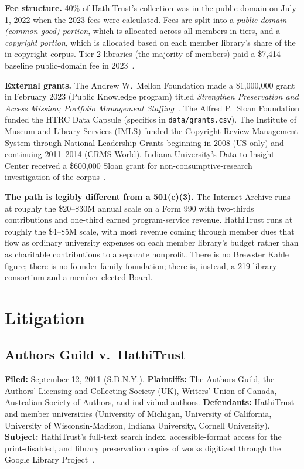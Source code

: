 \documentclass[10pt,letterpaper,twocolumn]{article}
\begin{document}
\textbf{Fee structure.} 40\% of HathiTrust's collection was in the public domain on July 1, 2022 when the 2023 fees were calculated. Fees are split into a \emph{public-domain (common-good) portion}, which is allocated across all members in tiers, and a \emph{copyright portion}, which is allocated based on each member library's share of the in-copyright corpus. Tier 2 libraries (the majority of members) paid a \$7{,}414 baseline public-domain fee in 2023~\citep{hathicost}.

\textbf{External grants.} The Andrew W.~Mellon Foundation made a \$1{,}000{,}000 grant in February 2023 (Public Knowledge program) titled \emph{Strengthen Preservation and Access Mission; Portfolio Management Staffing}~\citep{hathimellon2023}. The Alfred P.~Sloan Foundation funded the HTRC Data Capsule (specifics in \texttt{data/grants.csv}). The Institute of Museum and Library Services (IMLS) funded the Copyright Review Management System through National Leadership Grants beginning in 2008 (US-only) and continuing 2011--2014 (CRMS-World). Indiana University's Data to Insight Center received a \$600{,}000 Sloan grant for non-consumptive-research investigation of the corpus~\citep{iudata2011}.

\textbf{The path is legibly different from a 501(c)(3).} The Internet Archive runs at roughly the \$20--\$30M annual scale on a Form 990 with two-thirds contributions and one-third earned program-service revenue. HathiTrust runs at roughly the \$4--\$5M scale, with most revenue coming through member dues that flow as ordinary university expenses on each member library's budget rather than as charitable contributions to a separate nonprofit. There is no Brewster Kahle figure; there is no founder family foundation; there is, instead, a 219-library consortium and a member-elected Board.

\section{Litigation}\label{sec:litigation}

\subsection{Authors Guild v.~HathiTrust}

\textbf{Filed:} September 12, 2011 (S.D.N.Y.). \textbf{Plaintiffs:} The Authors Guild, the Authors' Licensing and Collecting Society (UK), Writers' Union of Canada, Australian Society of Authors, and individual authors. \textbf{Defendants:} HathiTrust and member universities (University of Michigan, University of California, University of Wisconsin-Madison, Indiana University, Cornell University). \textbf{Subject:} HathiTrust's full-text search index, accessible-format access for the print-disabled, and library preservation copies of works digitized through the Google Library Project~\citep{authorsguildwiki,hathirulingdistrict}.
\end{document}
